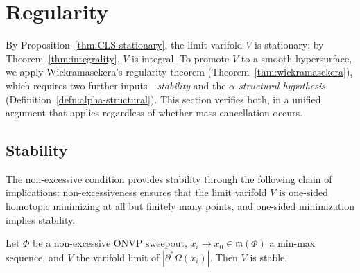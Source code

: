 
\section{Regularity}\label{sec:regularity}

By Proposition~\ref{thm:CLS-stationary}, the limit varifold $V$ is stationary; by Theorem~\ref{thm:integrality}, $V$ is integral. To promote $V$ to a smooth hypersurface, we apply Wickramasekera's regularity theorem (Theorem~\ref{thm:wickramasekera}), which requires two further inputs---\emph{stability} and the \emph{$\alpha$-structural hypothesis} (Definition~\ref{defn:alpha-structural}). This section verifies both, in a unified argument that applies regardless of whether mass cancellation occurs.

\subsection{Stability}\label{subsec:stability}

The non-excessive condition provides stability through the following chain of implications: non-excessiveness ensures that the limit varifold $V$ is one-sided homotopic minimizing at all but finitely many points, and one-sided minimization implies stability.

\begin{proposition}\label{prop:stability}
Let $\Phi$ be a non-excessive ONVP sweepout, $x_i \to x_0 \in \mathfrak{m}(\Phi)$ a min-max sequence, and $V$ the varifold limit of $|\partial^*\Omega(x_i)|$. Then $V$ is stable.
\end{proposition}

